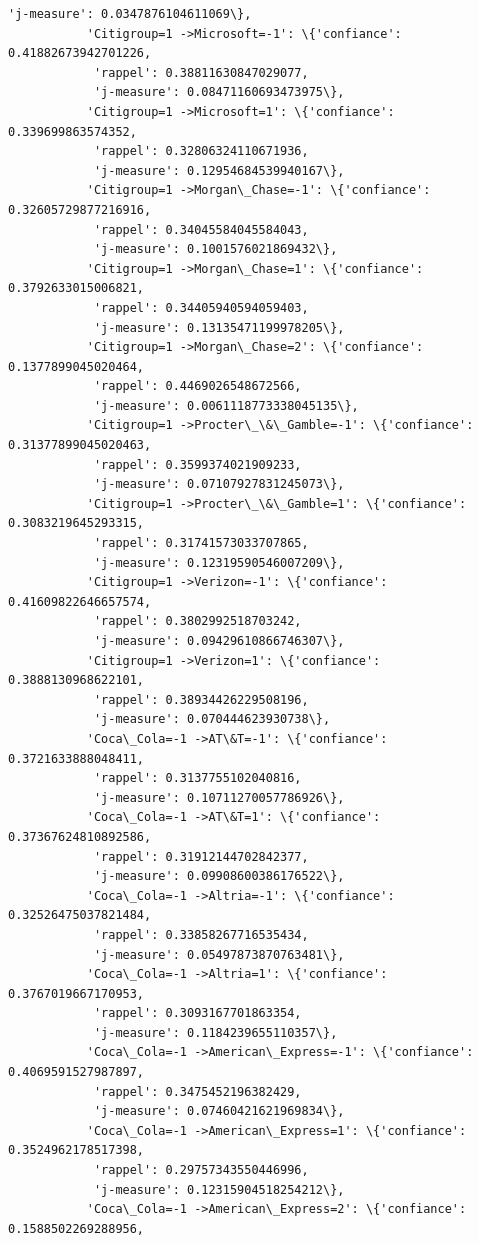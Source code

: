 \documentclass[11pt]{article}
\begin{document}
\begin{Verbatim}[commandchars=\\\{\}]
            'j-measure': 0.0347876104611069\},
           'Citigroup=1 ->Microsoft=-1': \{'confiance': 0.41882673942701226,
            'rappel': 0.38811630847029077,
            'j-measure': 0.08471160693473975\},
           'Citigroup=1 ->Microsoft=1': \{'confiance': 0.339699863574352,
            'rappel': 0.32806324110671936,
            'j-measure': 0.12954684539940167\},
           'Citigroup=1 ->Morgan\_Chase=-1': \{'confiance': 0.32605729877216916,
            'rappel': 0.34045584045584043,
            'j-measure': 0.1001576021869432\},
           'Citigroup=1 ->Morgan\_Chase=1': \{'confiance': 0.3792633015006821,
            'rappel': 0.34405940594059403,
            'j-measure': 0.13135471199978205\},
           'Citigroup=1 ->Morgan\_Chase=2': \{'confiance': 0.1377899045020464,
            'rappel': 0.4469026548672566,
            'j-measure': 0.0061118773338045135\},
           'Citigroup=1 ->Procter\_\&\_Gamble=-1': \{'confiance': 0.31377899045020463,
            'rappel': 0.3599374021909233,
            'j-measure': 0.07107927831245073\},
           'Citigroup=1 ->Procter\_\&\_Gamble=1': \{'confiance': 0.3083219645293315,
            'rappel': 0.31741573033707865,
            'j-measure': 0.12319590546007209\},
           'Citigroup=1 ->Verizon=-1': \{'confiance': 0.41609822646657574,
            'rappel': 0.3802992518703242,
            'j-measure': 0.09429610866746307\},
           'Citigroup=1 ->Verizon=1': \{'confiance': 0.3888130968622101,
            'rappel': 0.38934426229508196,
            'j-measure': 0.070444623930738\},
           'Coca\_Cola=-1 ->AT\&T=-1': \{'confiance': 0.3721633888048411,
            'rappel': 0.3137755102040816,
            'j-measure': 0.10711270057786926\},
           'Coca\_Cola=-1 ->AT\&T=1': \{'confiance': 0.37367624810892586,
            'rappel': 0.31912144702842377,
            'j-measure': 0.09908600386176522\},
           'Coca\_Cola=-1 ->Altria=-1': \{'confiance': 0.32526475037821484,
            'rappel': 0.33858267716535434,
            'j-measure': 0.05497873870763481\},
           'Coca\_Cola=-1 ->Altria=1': \{'confiance': 0.3767019667170953,
            'rappel': 0.3093167701863354,
            'j-measure': 0.1184239655110357\},
           'Coca\_Cola=-1 ->American\_Express=-1': \{'confiance': 0.4069591527987897,
            'rappel': 0.3475452196382429,
            'j-measure': 0.07460421621969834\},
           'Coca\_Cola=-1 ->American\_Express=1': \{'confiance': 0.3524962178517398,
            'rappel': 0.29757343550446996,
            'j-measure': 0.12315904518254212\},
           'Coca\_Cola=-1 ->American\_Express=2': \{'confiance': 0.1588502269288956,

\end{Verbatim}
\end{document}
